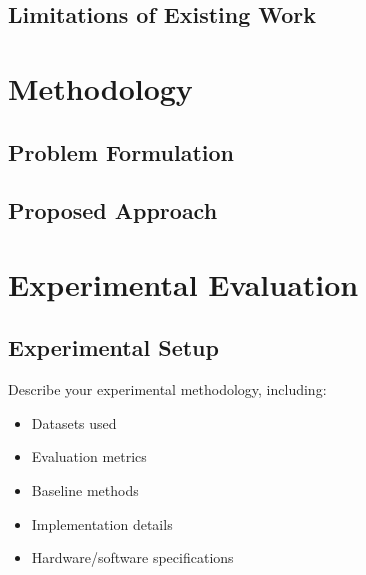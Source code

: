 \documentclass[11pt,a4paper]{article}
\begin{document}
\subsection{Limitations of Existing Work}
\label{subsec:limitations}


\section{Methodology}
\label{sec:methodology}


\subsection{Problem Formulation}
\label{subsec:formulation}


\subsection{Proposed Approach}
\label{subsec:approach}


\section{Experimental Evaluation}
\label{sec:experiments}


\subsection{Experimental Setup}
\label{subsec:setup}

Describe your experimental methodology, including:
\begin{itemize}
    \item Datasets used
    \item Evaluation metrics
    \item Baseline methods
    \item Implementation details
    \item Hardware/software specifications
\end{itemize}
\end{document}
